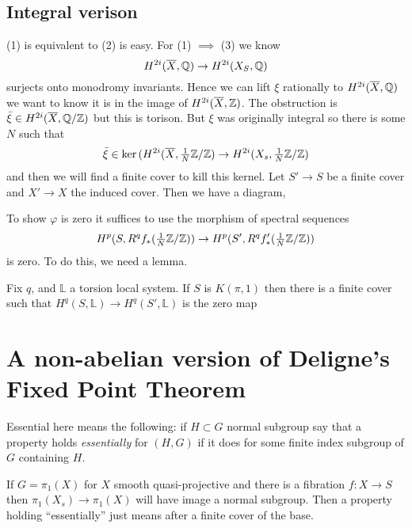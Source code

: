 \documentclass[12pt]{article}
\newcommand{\LL}{\mathbb{L}}
\begin{document}
\subsection{Integral verison}

(1) is equivalent to (2) is easy. For (1) $\implies$ (3) we know 
\[ H^{2i}(\overline{X}, \mathbb{Q}) \to H^{2i}(X_S, \mathbb{Q}) \]
surjects onto monodromy invariants. Hence we can lift $\xi$ rationally to $H^{2i}(\overline{X}, \mathbb{Q})$ we want to know it is in the image of $H^{2i}(\overline{X}, \mathbb{Z})$. The obstruction is $\bar{\xi} \in H^{2i}(\overline{X}, \mathbb{Q} / \mathbb{Z})$ but this is torison. But $\xi$ was originally integral so there is some $N$ such that 
\[ \bar{\xi} \in \ker{(H^{2i}(\overline{X}, \tfrac{1}{N} \mathbb{Z}/ \mathbb{Z}) \to H^{2i}(X_s, \tfrac{1}{N} \mathbb{Z}/ \mathbb{Z})} \]
and then we will find a finite \etale cover to kill this kernel. Let $S' \to S$ be a finite \etale cover and $X' \to X$ the induced cover. Then we have a diagram,
\begin{center}
\end{center}
To show $\varphi$ is zero it suffices to use the morphism of spectral sequences
\[ H^p(S, R^q f_* (\tfrac{1}{N} \mathbb{Z} / \mathbb{Z})) \to H^p(S', R^q f'_* (\tfrac{1}{N} \mathbb{Z} / \mathbb{Z})) \]
is zero. To do this, we need a lemma.

\begin{lemma}
Fix $q$, and $\LL$ a torsion local system. If $S$ is $K(\pi, 1)$ then there is a finite \etale cover such that $H^q(S, \LL) \to H^q(S', \LL)$ is the zero map
\end{lemma}

\section{A non-abelian version of Deligne's Fixed Point Theorem}

Essential here means the following: if $H \subset G$ normal subgroup say that a property holds \textit{essentially} for $(H, G)$ if it does for some finite index subgroup of $G$ containing $H$. 

\begin{example}
If $G = \pi_1(X)$ for $X$ smooth quasi-projective and there is a fibration $f : X \to S$ then $\pi_1(X_s) \to \pi_1(X)$ will have image a normal subgroup. Then a property holding ``essentially'' just means after a finite \etale cover of the base. 
\end{example}
\end{document}
